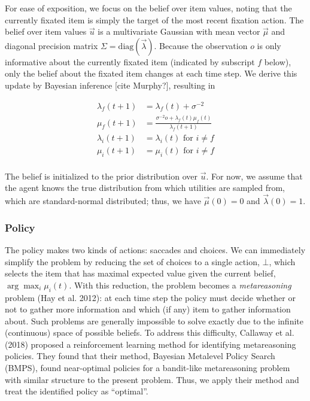 \documentclass[12pt,a4paperpaper,]{article}
\begin{document}
For ease of exposition, we focus on the belief over item values, noting
that the currently fixated item is simply the target of the most recent
fixation action. The belief over item values \(\vec{u}\) is a
multivariate Gaussian with mean vector \(\vec{\mu}\) and diagonal
precision matrix \(\Sigma = \text{diag}(\vec{\lambda})\). Because the
observation \(o\) is only informative about the currently fixated item
(indicated by subscript \(f\) below), only the belief about the fixated
item changes at each time step. We derive this update by Bayesian
inference {[}cite Murphy?{]}, resulting in

\[
\begin{aligned}
\lambda_f(t+1) &= \lambda_f(t) + \sigma^{-2}  \\
\mu_f(t+1) &= \frac{\sigma^{-2} o + \lambda_f(t) \mu_f(t)}{\lambda_f(t+1)}  \\
\lambda_i(t+1) &= \lambda_i(t) \text{ for } i \neq f  \\
\mu_i(t+1) &= \mu_i(t) \text{ for } i \neq f  \\
\end{aligned}
\]

The belief is initialized to the prior distribution over \(\vec{u}\).
For now, we assume that the agent knows the true distribution from which
utilities are sampled from, which are standard-normal distributed; thus,
we have \(\vec{\mu}(0) = 0\) and \(\vec{\lambda}(0) = 1\).

\subsubsection{Policy}\label{policy}

The policy makes two kinds of actions: saccades and choices. We can
immediately simplify the problem by reducing the set of choices to a
single action, \(\bot\), which selects the item that has maximal
expected value given the current belief, \(\arg\max_i \mu_i(t)\). With
this reduction, the problem becomes a \emph{metareasoning} problem (Hay
et al. 2012): at each time step the policy must decide whether or not to
gather more information and which (if any) item to gather information
about. Such problems are generally impossible to solve exactly due to
the infinite (continuous) space of possible beliefs. To address this
difficulty, Callaway et al. (2018) proposed a reinforcement learning
method for identifying metareasoning policies. They found that their
method, Bayesian Metalevel Policy Search (BMPS), found near-optimal
policies for a bandit-like metareasoning problem with similar structure
to the present problem. Thus, we apply their method and treat the
identified policy as ``optimal''.
\end{document}
